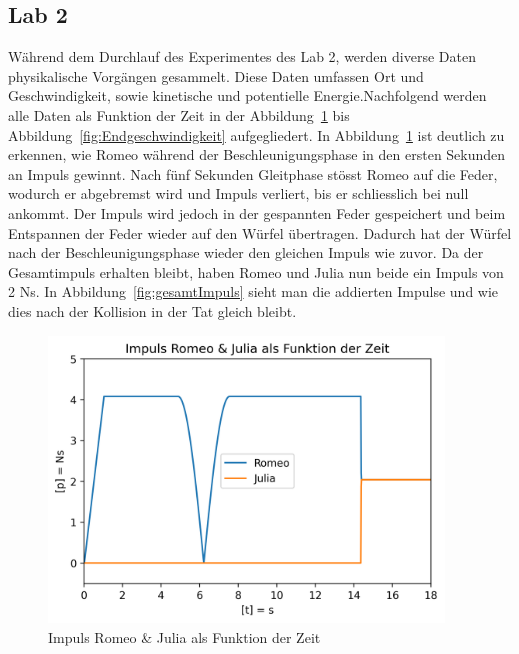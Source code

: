 \documentclass[../main.tex]{subfiles}
\begin{document}
    \subsection{Lab 2}
    Während dem Durchlauf des Experimentes des Lab 2, werden diverse Daten physikalische Vorgängen
    gesammelt. Diese Daten umfassen Ort und Geschwindigkeit, sowie kinetische und potentielle Energie.Nachfolgend werden alle Daten als Funktion der Zeit in der Abbildung~\ref{fig:ImpulsRomeoJulia} bis Abbildung~\ref{fig:Endgeschwindigkeit}
    aufgegliedert.
    \newline
    \newline
    In Abbildung~\ref{fig:ImpulsRomeoJulia} ist deutlich zu erkennen, wie Romeo
    während der Beschleunigungsphase in den ersten Sekunden an Impuls gewinnt. 
    Nach fünf Sekunden Gleitphase stösst Romeo auf die Feder, wodurch er abgebremst
    wird und Impuls verliert, bis er schliesslich bei null ankommt. Der Impuls wird
    jedoch in der gespannten Feder gespeichert und beim Entspannen der Feder wieder
    auf den Würfel übertragen. Dadurch hat der Würfel nach der Beschleunigungsphase 
    wieder den gleichen Impuls wie zuvor. Da der Gesamtimpuls erhalten bleibt, haben Romeo und Julia nun beide ein Impuls von 2 Ns. In Abbildung~\ref{fig:gesamtImpuls} sieht man die addierten Impulse und wie dies nach der Kollision in der Tat gleich bleibt.
    \begin{figure}[H]
        \begin{center}
            \centerline{\includegraphics[width=105mm]{./images/Inelastisch/ImpulsRomeoJulia}}
            \caption{Impuls Romeo \& Julia als Funktion der Zeit}
            \label{fig:ImpulsRomeoJulia}
        \end{center}
    \end{figure}
\end{document}
